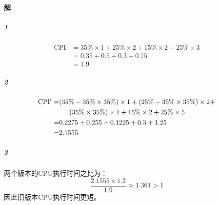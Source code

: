 \documentclass{article}
\begin{document}
\paragraph{解}
\subparagraph{1}
\begin{align*}
    \text{CPI} &= 35\% \times 1 + 25\% \times 2 + 15\% \times 2 + 25\% \times 3 \\
    &= 0.35 + 0.5 + 0.3 + 0.75 \\
    &= 1.9
\end{align*}
\subparagraph{2}
\begin{align*}
    \text{CPI}' =& (35\% - 35\% \times 35\%) \times 1 + (25\% - 35\% \times 35\%) \times 2 + \\
    & \indent (35\% \times 35\%) \times 1 +  15\% \times 2 + 25\% \times 5 \\
    =& 0.2275 + 0.255 + 0.1225 + 0.3 + 1.25 \\
    =& 2.1555
\end{align*}
\subparagraph{3}
两个版本的CPU执行时间之比为：
\begin{equation*}
    \frac{2.1555 \times 1.2}{1.9} \approx 1.361 > 1
\end{equation*}
因此旧版本CPU执行时间更短。
\end{document}
